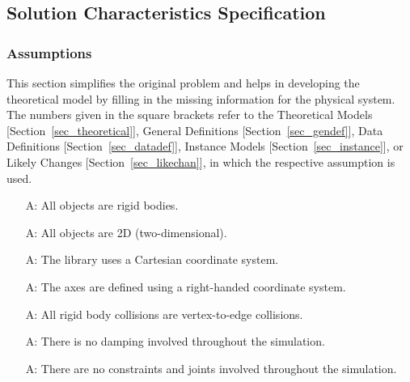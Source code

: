 \documentclass[12pt]{article}
\newcounter{assumpnum} %
\begin{document}
\subsection{Solution Characteristics Specification}

\subsubsection{Assumptions}
\label{sec_assu}
This section simplifies the original problem and helps in developing the theoretical model by filling in the missing information for the physical system. The numbers given in the square brackets refer to the Theoretical Models [Section~\ref{sec_theoretical}], General Definitions [Section~\ref{sec_gendef}], Data Definitions [Section~\ref{sec_datadef}], Instance Models [Section~\ref{sec_instance}], or Likely Changes [Section~\ref{sec_likechan}], in which the respective assumption is used.

\begin{itemize}
\item [A\refstepcounter{assumpnum}\theassumpnum \label{A_rigid}:] All objects are rigid bodies.

\item [A\refstepcounter{assumpnum}\theassumpnum \label{A_2d}:] All objects are 2D (two-dimensional).

\item[A\refstepcounter{assumpnum}\theassumpnum \label{A_cartesian}:]  The library uses a Cartesian coordinate system.

\item[A\refstepcounter{assumpnum}\theassumpnum \label{A_right}:] The axes are defined using a right-handed coordinate system.

\item[A\refstepcounter{assumpnum}\theassumpnum \label{A_col}:] All rigid body collisions are vertex-to-edge collisions.

\item[A\refstepcounter{assumpnum}\theassumpnum \label{A_damping}:] There is no damping involved throughout the simulation.

\item[A\refstepcounter{assumpnum}\theassumpnum \label{A_constraints}:] There are no constraints and joints involved throughout the simulation.

\end{itemize}
\end{document}
